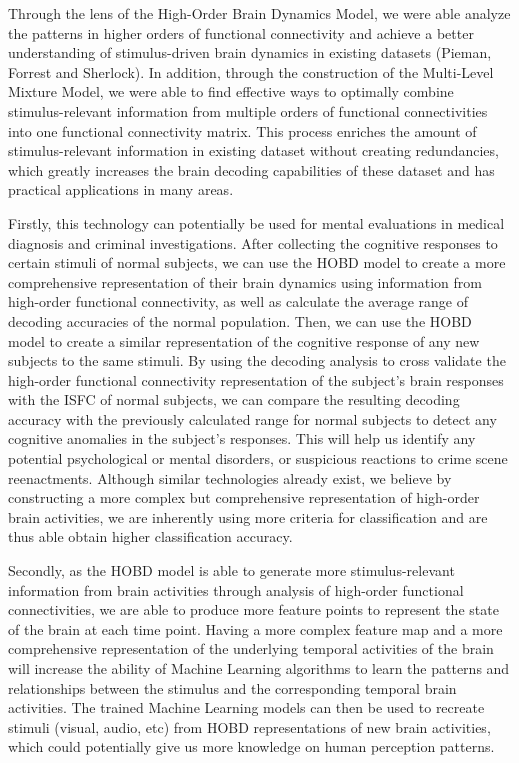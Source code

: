 \documentclass[11pt]{article}
\begin{document}
Through the lens of the High-Order Brain Dynamics Model, we were able analyze the patterns in higher orders of functional connectivity and achieve a better understanding of stimulus-driven brain dynamics in existing datasets (Pieman, Forrest and Sherlock). In addition, through the construction of the Multi-Level Mixture Model, we were able to find effective ways to optimally combine stimulus-relevant information from multiple orders of functional connectivities into one functional connectivity matrix. This process enriches the amount of stimulus-relevant information in existing dataset without creating redundancies, which greatly increases the brain decoding capabilities of these dataset and has practical applications in many areas.

Firstly, this technology can potentially be used for mental evaluations in medical diagnosis and criminal investigations. After collecting the cognitive responses to certain stimuli of normal subjects, we can use the HOBD model to create a more comprehensive representation of their brain dynamics using information from high-order functional connectivity, as well as calculate the average range of decoding accuracies of the normal population. Then, we can use the HOBD model to create a similar representation of the cognitive response of any new subjects to the same stimuli. By using the decoding analysis to cross validate the high-order functional connectivity representation of the subject's brain responses with the ISFC of normal subjects, we can compare the resulting decoding accuracy with the previously calculated range for normal subjects to detect any cognitive anomalies in the subject's responses. This will help us identify any potential psychological or mental disorders, or suspicious reactions to crime scene reenactments. Although similar technologies already exist, we believe by constructing a more complex but comprehensive representation of high-order brain activities, we are inherently using more criteria for classification and are thus able obtain higher classification accuracy.

Secondly, as the HOBD model is able to generate more stimulus-relevant information from brain activities through analysis of high-order functional connectivities, we are able to produce more feature points to represent the state of the brain at each time point. Having a more complex feature map and a more comprehensive representation of the underlying temporal activities of the brain will increase the ability of Machine Learning algorithms to learn the patterns and relationships between the stimulus and the corresponding temporal brain activities. The trained Machine Learning models can then be used to recreate stimuli (visual, audio, etc) from HOBD representations of new brain activities, which could potentially give us more knowledge on human perception patterns.
\end{document}

